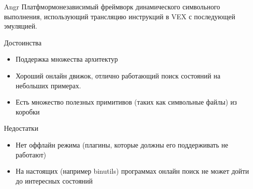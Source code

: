 \documentclass[10pt]{beamer}
\begin{document}

\begin{frame}{Angr}
    Платфмормонезависимый фреймворк динамического символьного выполнения, использующий трансляцию инструкций в VEX с последующей эмуляцией.
    \begin{block}{Достоинства}
      \begin{itemize}
        \item Поддержка множества архитектур
        \item Хороший онлайн движок, отлично работающий поиск состояний на небольших примерах.
        \item Есть множество полезных примитивов (таких как символьные файлы) из коробки
      \end{itemize}
    \end{block}
        \begin{block}{Недостатки}
          \begin{itemize}
      \item Нет оффлайн режима (плагины, которые должны его поддерживать не работают)
      \item На настоящих (например binutils) программах онлайн поиск не может дойти до интересных состояний 
      \end{itemize}
    \end{block}
\end{frame}
\end{document}
